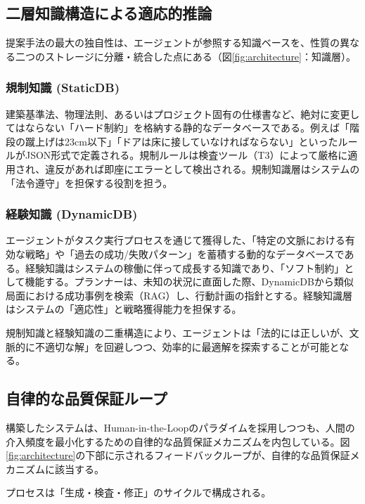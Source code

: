\documentclass[dvipdfmx, a4paper, 9pt]{deimj}
\begin{document}
\subsection{二層知識構造による適応的推論}

提案手法の最大の独自性は、エージェントが参照する知識ベースを、性質の異なる二つのストレージに分離・統合した点にある（図\ref{fig:architecture}：知識層）。

\subsubsection{規制知識 (StaticDB)}

建築基準法、物理法則、あるいはプロジェクト固有の仕様書など、絶対に変更してはならない「ハード制約」を格納する静的なデータベースである。例えば「階段の蹴上げは23cm以下」「ドアは床に接していなければならない」といったルールがJSON形式で定義される。規制ルールは検査ツール（T3）によって厳格に適用され、違反があれば即座にエラーとして検出される。規制知識層はシステムの「法令遵守」を担保する役割を担う。

\subsubsection{経験知識 (DynamicDB)}

エージェントがタスク実行プロセスを通じて獲得した、「特定の文脈における有効な戦略」や「過去の成功/失敗パターン」を蓄積する動的なデータベースである\cite{wang2023voyager}。経験知識はシステムの稼働に伴って成長する知識であり、「ソフト制約」として機能する。プランナーは、未知の状況に直面した際、DynamicDBから類似局面における成功事例を検索（RAG\cite{lewis2020rag}）し、行動計画の指針とする。経験知識層はシステムの「適応性」と戦略獲得能力を担保する。

規制知識と経験知識の二重構造により、エージェントは「法的には正しいが、文脈的に不適切な解」を回避しつつ、効率的に最適解を探索することが可能となる。

\subsection{自律的な品質保証ループ}

構築したシステムは、Human-in-the-Loopのパラダイムを採用しつつも、人間の介入頻度を最小化するための自律的な品質保証メカニズムを内包している。図\ref{fig:architecture}の下部に示されるフィードバックループが、自律的な品質保証メカニズムに該当する。

プロセスは「生成・検査・修正」のサイクルで構成される。
\end{document}
